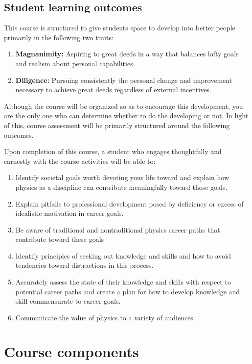 \documentclass{syllabus}
\begin{document}
\subsection*{Student learning outcomes} 
This course is structured to give students space to develop into better people primarily in the following two traits:
\begin{enumerate}[label=\textcolor{CarthageDark}{\bfseries\arabic*.}]
    \item\textbf{Magnanimity:} Aspiring to great deeds in a way that balances lofty goals and realism about personal capabilities.
    \item\textbf{Diligence:} Pursuing consistently the personal change and improvement necessary to achieve great deeds regardless of external incentives.
\end{enumerate}
Although the course will be organized so as to encourage this development, you are the only one who can determine whether to do the developing or not. In light of this, course assessment will be primarily structured around the following outcomes. 

Upon completion of this course, a student who engages thoughtfully and earnestly with the course activities will be able to:
\begin{enumerate}[label=\textcolor{CarthageDark}{\bfseries\arabic*.}]
    \item Identify societal goals worth devoting your life toward and explain how physics as a discipline can contribute meaningfully toward those goals.
    \item Explain pitfalls to professional development posed by deficiency or excess of idealistic motivation in career goals.
    \item Be aware of traditional and nontraditional physics career paths that contribute toward these goals
    \item Identify principles of seeking out knowledge and skills and how to avoid tendencies toward distractions in this process.
    \item Accurately assess the state of their knowledge and skills with respect to potential career paths and create a plan for how to develop knowledge and skill commensurate to career goals.
    \item Communicate the value of physics to a variety of audiences.
\end{enumerate}



\section*{Course components}
\end{document}
